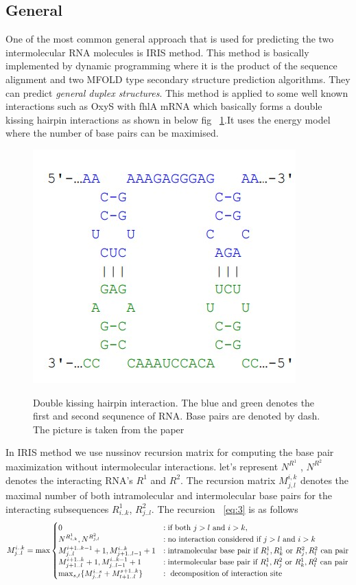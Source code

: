 \documentclass[twoside,a4paper]{report}
\begin{document}
	\subsection{General}
	One of the most common general approach that is used for predicting the two intermolecular RNA molecules is IRIS \citep{pervouchine2004iris} method. This method is basically implemented by dynamic programming where it is the product of the sequence alignment and two MFOLD type secondary structure prediction algorithms. They can predict \textit{general duplex structures}. This method is applied to some well known interactions such as OxyS with fhlA mRNA which basically forms a double kissing hairpin interactions as shown in below fig ~\ref{fig:doublekiss}.It uses the energy model where the number of base pairs can be maximised.\\
	
	 \begin{figure}[H]
		\includegraphics[width=0.4\linewidth]{doublekiss}
		\centering
		\caption{ Double kissing hairpin interaction. The blue and green denotes the first and second sequnence of RNA. Base pairs are denoted by dash. The picture is taken from the paper } 
		\citep{wright2018structure}
		\label{fig:doublekiss}
	\end{figure}
	
	In IRIS method we use nussinov recursion matrix for computing the base pair maximization without intermolecular interactions. let's represent $N^{R^1}$ , $N^{R^2}$ denotes the interacting RNA's $R^1$ and $R^2$. The recursion matrix $M^{i, k}_{j, l}$ denotes the maximal number of both intramolecular and intermolecular base pairs for the interacting subsequences $ R^1_{i..k}$, $R^2_{j..l}$. The recursion ~\ref{eq:3} is as follows    \\ 
	
	 \begin{equation}
	 \label{eq:3}
	M^{i..k}_{j..l} = \max \begin{cases}
	0 & : \text{if both $j > l $  and $ i > k $}, \\
	N^{R^1_{i,k}} , N^{R^2_{j,l}} & : \text{no interaction considered if $j > l $  and $ i > k $} \\
	M^{i+1..k-1}_{j..l}+1 , M^{i..k}_{j+1..l-1}+1 & : \text{intramolecular base pair if $R^1_i, R^1_k $  or $ R^2_j , R^2_l$ can pair}  \\
	M^{i+1..k}_{j+1..l}+1 , M^{i..k-1}_{j..l-1}+1 & : \text{intermolecular base pair if $R^1_i, R^2_j $  or $ R^1_k , R^2_l$ can pair} \\
	\max_{s,t} \{ 
	M^{i..s}_{j..t} + 	M^{s+1..k}_{t+1..l} \} & : \text{ decomposition of interaction site}\\
	\end{cases}
	\end{equation}
	
\end{document}
